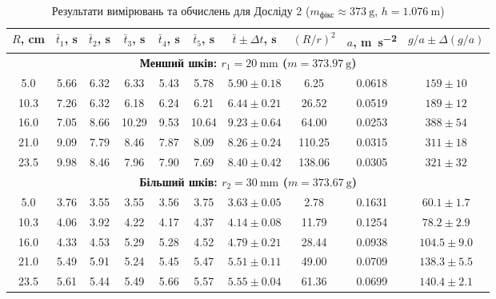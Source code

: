 \documentclass[ukrainian]{ucaphyslab}
\begin{document}
\begin{table}[H]
  \centering
  \small
  \begin{tabular}{@{}cccccccccc@{}}
    \toprule
    $R$, \si{\centi\meter} & $\bar{t}_1$, \si{\second} & $\bar{t}_2$, \si{\second} & $\bar{t}_3$, \si{\second} & $\bar{t}_4$, \si{\second} & $\bar{t}_5$, \si{\second} & $\bar{t} \pm \Delta t$, \si{\second} & $(R/r)^2$ & $a$, \si{\meter\per\second\squared} & $g/a \pm \Delta(g/a)$ \\
    \midrule
    \multicolumn{10}{c}{\textbf{Менший шків: $r_1 = \SI{20}{\milli\meter}$ ($m = \SI{373.97}{\gram}$)}} \\
    \midrule
    5.0  & 5.66 & 6.32 & 6.33 & 5.43 & 5.78 & $5.90 \pm 0.18$ & 6.25   & 0.0618 & $159 \pm 10$ \\
    10.3 & 7.26 & 6.32 & 6.18 & 6.24 & 6.21 & $6.44 \pm 0.21$ & 26.52  & 0.0519 & $189 \pm 12$ \\
    16.0 & 7.05 & 8.66 & 10.29 & 9.53 & 10.64 & $9.23 \pm 0.64$ & 64.00  & 0.0253 & $388 \pm 54$ \\
    21.0 & 9.09 & 7.79 & 8.46 & 7.87 & 8.09 & $8.26 \pm 0.24$ & 110.25 & 0.0315 & $311 \pm 18$ \\
    23.5 & 9.98 & 8.46 & 7.96 & 7.90 & 7.69 & $8.40 \pm 0.42$ & 138.06 & 0.0305 & $321 \pm 32$ \\
    \midrule
    \multicolumn{10}{c}{\textbf{Більший шків: $r_2 = \SI{30}{\milli\meter}$ ($m = \SI{373.67}{\gram}$)}} \\
    \midrule
    5.0  & 3.76 & 3.55 & 3.55 & 3.56 & 3.75 & $3.63 \pm 0.05$ & 2.78   & 0.1631 & $60.1 \pm 1.7$ \\
    10.3 & 4.06 & 3.92 & 4.22 & 4.17 & 4.37 & $4.14 \pm 0.08$ & 11.79  & 0.1254 & $78.2 \pm 2.9$ \\
    16.0 & 4.33 & 4.53 & 5.29 & 5.28 & 4.52 & $4.79 \pm 0.21$ & 28.44  & 0.0938 & $104.5 \pm 9.0$ \\
    21.0 & 5.49 & 5.91 & 5.24 & 5.45 & 5.47 & $5.51 \pm 0.11$ & 49.00  & 0.0709 & $138.3 \pm 5.5$ \\
    23.5 & 5.61 & 5.44 & 5.49 & 5.66 & 5.57 & $5.55 \pm 0.04$ & 61.36  & 0.0699 & $140.4 \pm 2.1$ \\
    \bottomrule
  \end{tabular}
  \caption{Результати вимірювань та обчислень для Досліду 2 ($m_{\text{фікс}} \approx \SI{373}{\gram}$, $h = \SI{1.076}{\meter}$)}
  \label{tab:exp2}
\end{table}

\end{document}
